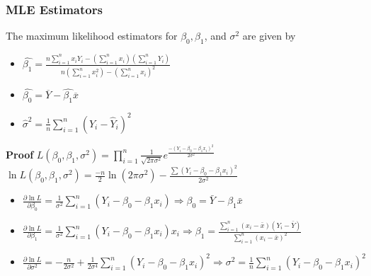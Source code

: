 \documentclass{article}
\begin{document}
\subsubsection{MLE Estimators}
The maximum likelihood estimators for $\beta_0,\beta_1$, and $\sigma^2$ are given by
\begin{itemize}
    \item $\hat{\beta_1}=\frac{n\sum_{i=1}^nx_iY_i-(\sum_{i=1}^nx_i)(\sum_{i=1}^nY_i)}{n(\sum_{i=1}^nx_i^2)-(\sum_{i=1}^nx_i)^2}$
    \item $\hat{\beta_0}=\overline{Y}-\hat{\beta_1}\overline{x}$
    \item $\hat{\sigma}^2=\frac{1}{n}\sum_{i=1}^n(Y_i-\hat{Y}_i)^2$
\end{itemize}
\textbf{Proof}
$L(\beta_0,\beta_1,\sigma^2)=\prod_{i=1}^n\frac{1}{\sqrt{2\pi\sigma^2}}e^{\frac{-(Y_i-\beta_0-\beta_1x_i)^2}{2\sigma^2}}$\\
$\ln L(\beta_0,\beta_1,\sigma^2)=\frac{-n}{2}\ln(2\pi\sigma^2)-\frac{\sum(Y_i-\beta_0-\beta_1x_i)^2}{2\sigma^2}$
\begin{itemize}
    \item $
    \frac{\partial \ln L}{\partial \beta_0} = \frac{1}{\sigma^2} \sum_{i=1}^n (Y_i - \beta_0 - \beta_1 x_i) \Rightarrow \beta_0 = \bar{Y} - \beta_1 \bar{x}$

    \item 
    $\frac{\partial \ln L}{\partial \beta_1} = \frac{1}{\sigma^2} \sum_{i=1}^n (Y_i - \beta_0 - \beta_1 x_i)x_i \Rightarrow \beta_1 = \frac{\sum_{i=1}^n (x_i - \bar{x})(Y_i - \bar{Y})}{\sum_{i=1}^n (x_i - \bar{x})^2}$

    \item $\frac{\partial \ln L}{\partial \sigma^2} = -\frac{n}{2\sigma^2} + \frac{1}{2\sigma^4} \sum_{i=1}^n (Y_i - \beta_0 - \beta_1 x_i)^2 \Rightarrow \sigma^2 = \frac{1}{n} \sum_{i=1}^n (Y_i - \beta_0 - \beta_1 x_i)^2$
\end{itemize}
\end{document}
